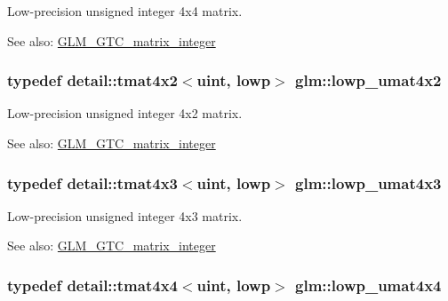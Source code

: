 Low-precision unsigned integer 4x4 matrix. \begin{Desc}
\item[See also:]\hyperlink{group__gtc__matrix__integer}{GLM\_\-GTC\_\-matrix\_\-integer} \end{Desc}
\hypertarget{group__gtc__matrix__integer_g7583563f93096623d54ec8fddd806d13}{
\subsubsection[lowp\_\-umat4x2]{\setlength{\rightskip}{0pt plus 5cm}typedef detail::tmat4x2$<$uint, lowp$>$ {\bf glm::lowp\_\-umat4x2}}}
\label{group__gtc__matrix__integer_g7583563f93096623d54ec8fddd806d13}


Low-precision unsigned integer 4x2 matrix. \begin{Desc}
\item[See also:]\hyperlink{group__gtc__matrix__integer}{GLM\_\-GTC\_\-matrix\_\-integer} \end{Desc}
\hypertarget{group__gtc__matrix__integer_g03af6e7ea92be81959305fc89a239cf5}{
\subsubsection[lowp\_\-umat4x3]{\setlength{\rightskip}{0pt plus 5cm}typedef detail::tmat4x3$<$uint, lowp$>$ {\bf glm::lowp\_\-umat4x3}}}
\label{group__gtc__matrix__integer_g03af6e7ea92be81959305fc89a239cf5}


Low-precision unsigned integer 4x3 matrix. \begin{Desc}
\item[See also:]\hyperlink{group__gtc__matrix__integer}{GLM\_\-GTC\_\-matrix\_\-integer} \end{Desc}
\hypertarget{group__gtc__matrix__integer_g394ee910348beffe9c7d6b694d5efe5f}{
\subsubsection[lowp\_\-umat4x4]{\setlength{\rightskip}{0pt plus 5cm}typedef detail::tmat4x4$<$uint, lowp$>$ {\bf glm::lowp\_\-umat4x4}}}
\label{group__gtc__matrix__integer_g394ee910348beffe9c7d6b694d5efe5f}


